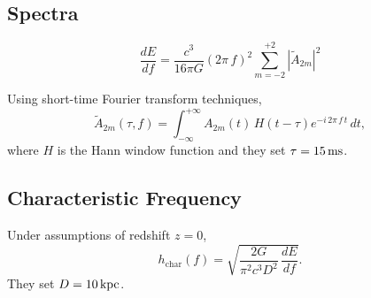 \documentclass[aspectratio=169]{beamer}
\begin{document}
\subsection{Spectra}

\begin{frame}

  \begin{equation*}
    \frac{dE}{df}=\frac{c^{3}}{16\pi G}\left(2\pi\,f\right)^{2}
    \sum\limits_{m=-2}^{+2}\left|\tilde{A}_{2m}\right|^{2}
  \end{equation*}

\end{frame}

\begin{frame}

  Using short-time Fourier transform techniques,
  \begin{equation*}
    \tilde{A}_{2m}\left(\tau,f\right)
    =\int_{-\infty}^{+\infty}A_{2m}\left(t\right)\,H\left(t-\tau\right)
    e^{-i\,2\pi\,f\,t}\,dt,
  \end{equation*}
  where $H$ is the Hann window function and they set $\tau=15\,\mathrm{ms}$.

\end{frame}

\subsection{Characteristic Frequency}

\begin{frame}

  Under assumptions of redshift $z=0$,
  \begin{equation*}
  h_{\mathrm{char}}\left(f\right)
  =\sqrt{\frac{2G}{\pi^{2}c^{3}D^{2}}\,\frac{dE}{df}}.
  \end{equation*}
  They set $D=10\,\mathrm{kpc}$.

\end{frame}
\end{document}
